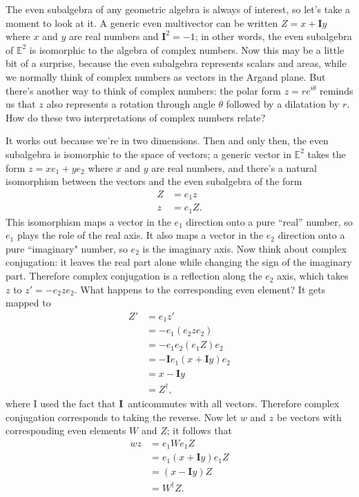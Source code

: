 \documentclass{utarticle}
\newcommand{\bl}[1]{\ensuremath{\bm{#1}}}
\newcommand{\I}{\bl{I}}
\newcommand{\rev}[1]{\ensuremath{#1^\dagger}}
\begin{document}
The even subalgebra of any geometric algebra is always of interest, so
let's take a moment to look at it.  A generic even multivector can be written 
$Z = x + \I y$ where $x$ and $y$ are real numbers and $\I^2=-1$; in other 
words, the even subalgebra of $\mathbb{E}^2$ is isomorphic to the algebra of
complex numbers.  Now this may be a little bit of a surprise, because the even 
subalgebra represents scalars and areas, while we normally think of  
complex numbers as vectors in the Argand plane.  But there's another
way to think of complex numbers: the polar form $z=re^{i\theta}$ reminds us
that $z$ also represents a rotation through angle $\theta$ followed by a
dilatation by $r$.  How do these two interpretations of complex numbers
relate?

It works out because we're in two dimensions.  Then and only then, the even 
subalgebra is isomorphic to the space of vectors; a generic vector in 
$\mathbb{E}^2$ takes the form $z = x e_1 + y e_2$ where $x$ and $y$ are 
real numbers, and there's a natural
isomorphism between the vectors and the even subalgebra of the form
\begin{align} Z & = e_1 z \nonumber \\  z & = e_1 Z. \end{align} 
This isomorphism maps a vector in the $e_1$ direction onto a pure
``real'' number, so $e_1$ plays the role of the real axis.  It also maps a 
vector in the $e_2$ direction onto a pure ``imaginary" number, so $e_2$ is
the imaginary axis.  Now think about complex conjugation: it leaves the real
part alone while changing the sign of the imaginary part.  Therefore
complex conjugation is a reflection along the $e_2$
axis, which takes $z$ to $z' = -e_2 z e_2$.  What happens to the
corresponding even element?  It gets mapped to
\begin{align}
Z' & = e_1 z' \nonumber \\
    & = -e_1 (e_2 z e_2) \nonumber \\
    & = -e_1 e_2 (e_1 Z) e_2 \nonumber \\
    & = -\I e_1 (x + \I y) e_2 \nonumber \\
    & = x - \I y \nonumber \\
    & = \rev{Z},
\end{align}
where I used the fact that \I\ anticommutes with all vectors.  Therefore 
complex conjugation corresponds to taking the reverse.  Now let $w$ 
and $z$ be vectors with corresponding even elements $W$ and $Z$; it follows that
\begin{align}
wz & = e_1 W e_1 Z \nonumber \\
      & = e_1 (x + \I y) e_1 Z \nonumber \\
      & = (x - \I y) Z \nonumber \\
      & = \rev{W} Z.
\end{align}
\end{document}
